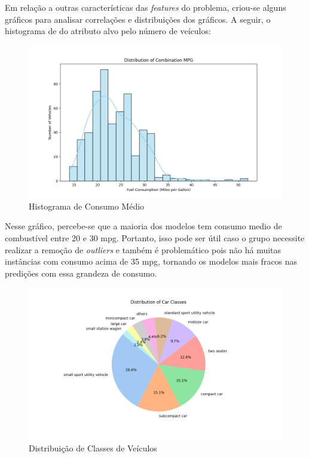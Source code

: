 \documentclass{report}
\begin{document}
Em relação a outras características das \textit{features} do problema, criou-se alguns gráficos para analisar correlações e distribuições dos gráficos. A seguir, o histograma de
do atributo alvo pelo número de veículos:

\begin{figure}[h!]
  \centering
  \includegraphics[width=\linewidth]{images/plots/combination_dist.png}
  \caption{\label{img:combination_dist} Histograma de Consumo Médio}
\end{figure}

Nesse gráfico, percebe-se que a maioria dos modelos tem consumo medio de combustível entre 20 e 30 mpg. Portanto, isso pode ser útil caso o grupo necessite realizar a remoção de \textit{outliers}
e também é problemático pois não há muitas instâncias com consumo acima de 35 mpg, tornando os modelos mais fracos nas predições com essa grandeza de consumo.

\clearpage
\begin{figure}[h!]
  \centering
  \includegraphics[width=\linewidth]{images/plots/classes_dist.png}
  \caption{\label{img:classes_dist} Distribuição de Classes de Veículos}
\end{figure}
\end{document}

